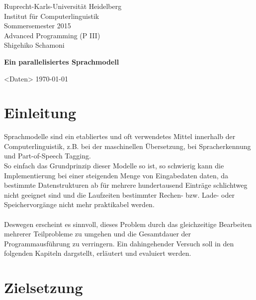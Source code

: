 \documentclass[a4paper,12pt]{scrartcl}
\begin{document}
\begin{titlepage}
\begin{small}
\vfill {Ruprecht-Karls-Universität Heidelberg\\ 
Institut für Computerlinguistik\\ 
Sommersemester 2015\\
Advanced Programming (P III) \\
Shigehiko Schamoni}
\end{small}


\begin{center}
\begin{Large}
\vfill {\textsf{\textbf{
Ein parallelisiertes Sprachmodell
}}}
\end{Large}
\end{center}

\begin{small}
\vfill <Daten>
\today
\end{small}

\end{titlepage}


\tableofcontents
\newpage
\thispagestyle{empty}

\section{Einleitung}

    Sprachmodelle sind ein etabliertes und oft verwendetes Mittel innerhalb der Computerlinguistik, z.B. bei der maschinellen Übersetzung, bei Spracherkennung und Part-of-Speech Tagging. \\
    So einfach das Grundprinzip dieser Modelle so ist, so schwierig kann die Implementierung bei einer steigenden Menge von Eingabedaten daten, da bestimmte Datenstrukturen ab für mehrere hundertausend Einträge schlichtweg nicht geeignet sind und die Laufzeiten bestimmter Rechen- bzw. Lade- oder Speichervorgänge nicht mehr praktikabel werden. \\ \\
    Deswegen erscheint es sinnvoll, dieses Problem durch das gleichzeitige Bearbeiten mehrerer Teilprobleme zu umgehen und die Gesamtdauer der Programmausführung zu verringern. Ein dahingehender Versuch soll in den folgenden Kapiteln dargstellt, erläutert und evaluiert werden.

\section{Zielsetzung}
\end{document}
